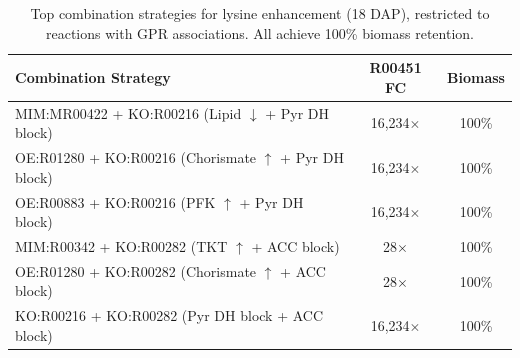 \documentclass[11pt,letterpaper]{article}
\begin{document}
\clearpage

\begin{table}[H]
\centering
\caption{Top combination strategies for lysine enhancement (18 DAP), restricted to reactions with GPR associations. All achieve 100\% biomass retention.}
\label{stab:combos}
\small
\begin{tabular}{lcc}
\toprule
Combination Strategy & R00451 FC & Biomass \\
\midrule
MIM:MR00422 + KO:R00216 (Lipid $\downarrow$ + Pyr DH block) & 16,234$\times$ & 100\% \\
OE:R01280 + KO:R00216 (Chorismate $\uparrow$ + Pyr DH block) & 16,234$\times$ & 100\% \\
OE:R00883 + KO:R00216 (PFK $\uparrow$ + Pyr DH block) & 16,234$\times$ & 100\% \\
MIM:R00342 + KO:R00282 (TKT $\uparrow$ + ACC block) & 28$\times$ & 100\% \\
OE:R01280 + KO:R00282 (Chorismate $\uparrow$ + ACC block) & 28$\times$ & 100\% \\
KO:R00216 + KO:R00282 (Pyr DH block + ACC block) & 16,234$\times$ & 100\% \\
\bottomrule
\end{tabular}
\end{table}

\clearpage
\end{document}
